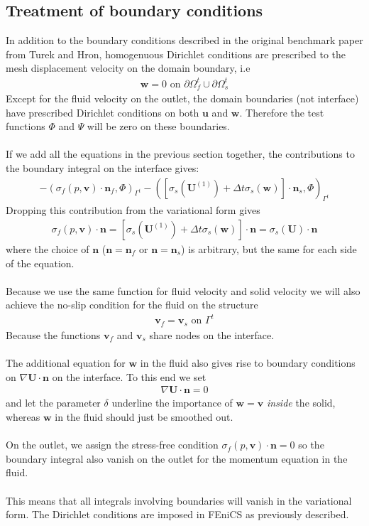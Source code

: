 \subsection{Treatment of boundary conditions}
In addition to the boundary conditions described in the original benchmark paper from Turek and Hron, homogenuous Dirichlet conditions are prescribed to the mesh displacement velocity on the domain boundary, i.e 
\begin{align} 
\mathbf{w} = 0 \text{ on } \partial \Omega_f^t \cup \partial \Omega_s^t
\end{align}
Except for the fluid velocity on the outlet, the domain boundaries (not interface) have prescribed Dirichlet conditions on both $\mathbf{u}$ and $\mathbf{w}$. Therefore the test functions $\Phi$ and $\Psi$ will be zero on these boundaries. \\ \\
If we add all the equations in the previous section together, the contributions to the boundary integral on the interface gives:
\begin{align}- (\sigma_f(p,\mathbf{v}) \cdot \mathbf{n}_f, \Phi)_{\Gamma^t} - ([\sigma_s(\mathbf{U}^{(1)}) + \Delta t \sigma_s(\mathbf{w})]\cdot \mathbf{n}_s, \Phi)_{\Gamma^t}
\end{align}
Dropping this contribution from the variational form gives
\begin{align} \sigma_f(p,\mathbf{v}) \cdot \mathbf{n} = [\sigma_s(\mathbf{U}^{(1)}) + \Delta t \sigma_s(\mathbf{w})] \cdot \mathbf{n} = \sigma_s(\mathbf{U}) \cdot \mathbf{n}
\end{align}
where the choice of $\mathbf{n}$ ($\mathbf{n} = \mathbf{n}_f$ or $\mathbf{n} = \mathbf{n}_s$) is arbitrary, but the same for each side of the equation. \\
\\
Because we use the same function for fluid velocity and solid velocity we will also achieve the no-slip condition for the fluid on the structure
\begin{align}
\mathbf{v}_f = \mathbf{v}_s \text{ on } \Gamma^t
\end{align}
Because the functions $\mathbf{v}_f$ and $\mathbf{v}_s$ share nodes on the interface.
\\
\\
The additional equation for $\mathbf{w}$ in the fluid also gives rise to boundary conditions on $\nabla \mathbf{U}\cdot\mathbf{n}$ on the interface. To this end we set 
\begin{align}
\nabla \mathbf{U} \cdot \mathbf{n} = 0
\end{align}
and let the parameter $\delta$ underline the importance of $\mathbf{w} = \mathbf{v}$ \textit{inside} the solid, whereas $\mathbf{w}$ in the fluid should just be smoothed out. \\
\\
On the outlet, we assign the stress-free condition $\sigma_f(p,\mathbf{v}) \cdot \mathbf{n} = 0$ so the boundary integral also vanish on the outlet for the momentum equation in the fluid. 
\\
\\
This means that all integrals involving boundaries will vanish in the variational form. The Dirichlet conditions are imposed in FEniCS as previously described.

